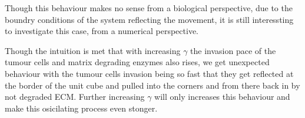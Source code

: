 Though this behaviour makes no sense from a biological perspective, due to the boundry conditions of the system reflecting the movement, it is still interessting to investigate this case, from a numerical perspective.\newline

Though the intuition is met that with increasing $\gamma$ the invasion pace of the tumour cells and matrix degrading enzymes also rises, we get unexpected behaviour with the tumour cells invasion being so fast that they get reflected at the border of the unit cube and pulled into the corners and from there back in by not degraded ECM. Further increasing $\gamma$ will only increases this behaviour and make this osicilating process even stonger.


